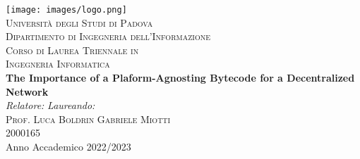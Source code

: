 



\begin{titlepage}
\begin{center}
\texttt{[image: images/logo.png]}\\

\vspace{0.8cm}
\textsc{\LARGE Universit\`{a} degli Studi di Padova}\\
\vspace{0.45cm}
\textsc{\large Dipartimento di Ingegneria dell'Informazione}\\
\vspace{0.4cm}
\textsc{\large Corso di Laurea Triennale in}\\
\textsc{\large Ingegneria Informatica}\\
\vfill
{ \LARGE \bfseries The Importance of a Plaform-Agnosting Bytecode for a Decentralized Network
}\\
\vfill
\textit{\large Relatore:} \hfill \textit{\large Laureando:}\\
\textsc{\large Prof. Luca Boldrin} \hfill \textsc{Gabriele Miotti}\\
\hfill \textsc{2000165}\\

\vfill
{\large Anno Accademico 2022/2023}
\end{center}
\end{titlepage}

\thispagestyle{empty} %
\cleardoublepage

\thispagestyle{empty}

\clearpage{\pagestyle{plain}\cleardoublepage}


\clearpage{\pagestyle{plain}\cleardoublepage}
\tableofcontents %

\clearpage{\pagestyle{plain}\cleardoublepage} %


\clearpage{\pagestyle{plain}\cleardoublepage} %


\clearpage{\pagestyle{plain}\cleardoublepage}


\clearpage{\pagestyle{plain}\cleardoublepage}


\clearpage{\pagestyle{plain}\cleardoublepage}


\clearpage{\pagestyle{plain}\cleardoublepage}




